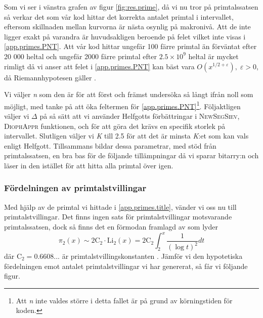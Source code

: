 Som vi ser i vänstra grafen av figur \ref{fig:res.prime}, då vi nu tror på primtalssatsen så verkar det som vår kod hittar det korrekta antalet primtal i intervallet, eftersom skillnaden mellan kurvorna är nästa osynlig på makronivå. 
Att de inte ligger exakt på varandra är huvudsakligen beroende på felet vilket inte visas i \eqref{app.primes.PNT}.
Att vår kod hittar ungefär 100 färre primtal än förväntat efter 20 000 heltal och ungefär 2000 färre primtal efter \(2.5\times10^9\) heltal är mycket rimligt då vi anser att felet i \eqref{app.primes.PNT} kan bäst vara \(O(x^{1/2 + \varepsilon}),\; \varepsilon > 0\), då Riemannhypotesen gäller \cite[Kapitel 5]{RiemannErr}.

Vi väljer \textit{n} som den är för att först och främst undersöka så långt ifrån noll som möjligt, med tanke på att öka feltermen för \eqref{app.primes.PNT}\footnote{Att \textit{n} inte valdes större i detta fallet är på grund av körningstiden för koden.}.
Följaktligen väljer vi \(\Delta\) på så sätt att vi använder Helfgotts förbättringar i \textsc{NewSegSiev}, \textsc{DiophAppr} funktionen, och för att göra det krävs en specifik storlek på intervallet.
Slutligen väljer vi \textit{K} till 2.5 för att det är minsta \textit{K}:et som kan vals enligt Helfgott.
Tillsammans bildar dessa parametrar, med stöd från primtalssatsen, en bra bas för de följande tillämpningar då vi sparar bitarry:n och läser in den istället för att hitta alla primtal över igen.

\subsubsection{Fördelningen av primtalstvillingar}

Med hjälp av de primtal vi hittade i \ref{app.primes.title}, vänder vi oss nu till primtalstvillingar. Det finns ingen sats för primtalstvillingar motsvarande primtalssatsen, dock så finns det en förmodan framlagd av \cite[Förmodan B]{Hardy} som lyder
\begin{equation}
    \pi_2(x) \sim 2\text{C}_2\cdot \text{Li}_2(x) = 2\text{C}_2\int_2^x\frac{1}{(\log t)^2}dt\label{app.twins.TWN}
\end{equation}
där \(\text{C}_2 = 0.6608...\) är primtalstvillingskonstanten \cite{TwinPrimeConstant}. Jämför vi den hypotetiska fördelningen emot antalet primtalstvillingar vi har genererat, så får vi följande figur.

